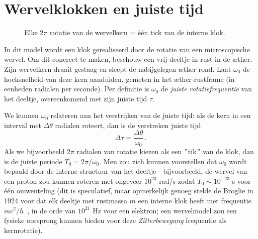 \section{Wervelklokken en juiste tijd}

\begin{figure}[H]
    \centering
    \caption{Elke $2\pi$ rotatie van de wervelkern = één tick van de interne klok.}
    \label{fig:wervelklok}
\end{figure}

In dit model wordt een klok gerealiseerd door de rotatie van een microscopische wervel. Om dit concreet te maken, beschouw een vrij deeltje in
rust in de æther. Zijn wervelkern draait gestaag en sleept de nabijgelegen æther rond. Laat $\omega_0$ de hoeksnelheid van deze kern  aanduiden, gemeten in het æther-rustframe (in eenheden radialen per seconde). Per definitie is $\omega_0$ de \emph{juiste rotatiefrequentie} van het deeltje, overeenkomend met zijn juiste tijd $\tau$.

We kunnen $\omega_0$ relateren aan het verstrijken van de juiste tijd: als de kern in een interval met $\Delta \theta$ radialen roteert, dan is de verstreken juiste tijd
\[
    \Delta \tau = \frac{\Delta \theta}{\omega_0} \,.
\]
Als we bijvoorbeeld $2\pi$ radialen van rotatie kiezen als een \("\)tik\("\) van de klok, dan is de juiste periode $T_0 = 2\pi/\omega_0$. Men zou zich kunnen voorstellen dat $\omega_0$ wordt bepaald door de interne structuur van het deeltje - bijvoorbeeld, de wervel van een proton zou kunnen roteren met ongeveer $10^{23}$ rad/s zodat $T_0 \sim 10^{-23}$ s voor één omwenteling (dit is speculatief, maar opmerkelijk genoeg stelde de Broglie in 1924 voor dat elk deeltje met rustmassa $m$ een interne klok heeft met frequentie $mc^2/h$~\cite{deBroglie1924-frequency}, in de orde van $10^{21}$ Hz voor een elektron; een wervelmodel zou een fysieke oorsprong kunnen bieden voor deze \emph{Zitterbewegung} frequentie als kernrotatie).

